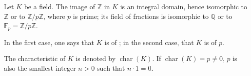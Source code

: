 Let $K$ be a field. The image of $\mathbb{Z}$ in $K$ is an integral domain, hence isomorphic to $\mathbb{Z}$ or to $\mathbb{Z}/p\mathbb{Z}$, where $p$ is prime; its field of fractions is isomorphic to $\mathbb{Q}$ or to $\mathbb{F}_p = \mathbb{Z}/p\mathbb{Z}$.

In the first case, one says that $K$ is of ; in the second case, that $K$ is of  $p$.

The characteristic of $K$ is denoted by $\operatorname{char}(K)$. If $\operatorname{char}(K) = p \neq 0$, $p$ is also the smallest integer $n > 0$ such that $n \cdot 1 = 0$.
